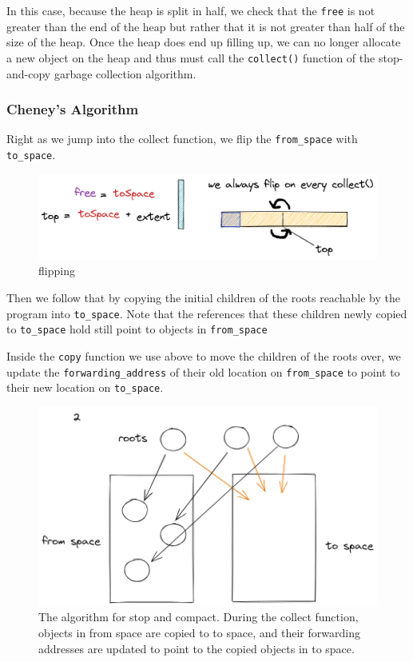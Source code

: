 \documentclass[index]{subfiles}
\begin{document}
In this case, because the heap is split in half, we check that the \verb+free+ is not greater than the end of the heap but rather that it is not greater than half of the size of the heap. Once the heap does end up filling up, we can no longer allocate a new object on the heap and thus must call the \verb+collect()+ function of the stop-and-copy garbage collection algorithm.

\subsubsection{Cheney's Algorithm}

Right as we jump into the collect function, we flip the \verb+from_space+ with \verb+to_space+.

\begin{figure}[H]
    \centering
    \includegraphics[scale=0.25]{pics/flipping.png}
    \caption{flipping}
\end{figure}

Then we follow that by copying the initial children of the roots reachable by the program into \verb+to_space+. Note that the references that these children newly copied to \verb+to_space+ hold still point to objects in \verb+from_space+

Inside the \verb+copy+ function we use above to move the children of the roots over, we update the \verb+forwarding_address+ of their old location on \verb+from_space+ to point to their new location on \verb+to_space+.

\begin{figure}[H]
    \centering
    \includegraphics[scale=0.3]{pics/visualization-of-worklist.png}
    \caption{The algorithm for stop and compact. During the collect function, objects in from space are copied to to space, and their forwarding addresses are updated to point to the copied objects in to space.}
\end{figure}
\end{document}

